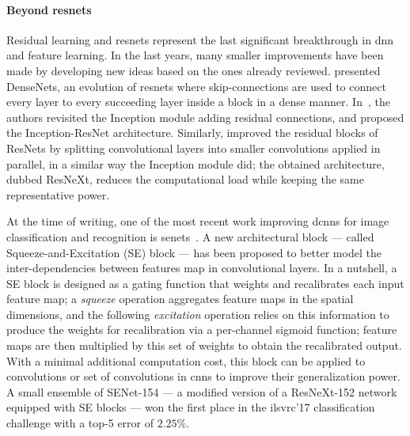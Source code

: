 \paragraph{Beyond \glspl{resnet}}
Residual learning and \glspl{resnet} represent the last significant breakthrough in \gls{dnn} and feature learning.
In the last years, many smaller improvements have been made by developing new ideas based on the ones already reviewed.
\citet{huang2017densely} presented DenseNets, an evolution of \glspl{resnet} where skip-connections are used to connect every layer to every succeeding layer inside a block in a dense manner.
In~\cite{szegedy2017inception}, the authors revisited the Inception module adding residual connections, and proposed the Inception-ResNet architecture.
Similarly, \citet{xie2017aggregated} improved the residual blocks of \glspl{ResNet} by splitting convolutional layers into smaller convolutions applied in parallel, in a similar way the Inception module did;
the obtained architecture, dubbed ResNeXt, reduces the computational load while keeping the same representative power.

At the time of writing, one of the most recent work improving \glspl{dcnn} for image classification and recognition is \glspl{senet}~\cite{hu2017squeeze}.
A new architectural block --- called Squeeze-and-Excitation (SE) block --- has been proposed to better model the inter-dependencies between features map in convolutional layers.
In a nutshell, a SE block is designed as a gating function that weights and recalibrates each input feature map;
a \emph{squeeze} operation aggregates feature maps in the spatial dimensions, and the following \emph{excitation} operation relies on this information to produce the weights for recalibration via a per-channel sigmoid function;
feature maps are then multiplied by this set of weights to obtain the recalibrated output.
With a minimal additional computation cost, this block can be applied to convolutions or set of convolutions in \glspl{cnn} to improve their generalization power.
A small ensemble of SENet-154 --- a modified version of a ResNeXt-152 network~\cite{xie2017aggregated} equipped with SE blocks --- won the first place in the \gls{ilsvrc}'17 classification challenge with a top-5 error of $2.25 \%$.


